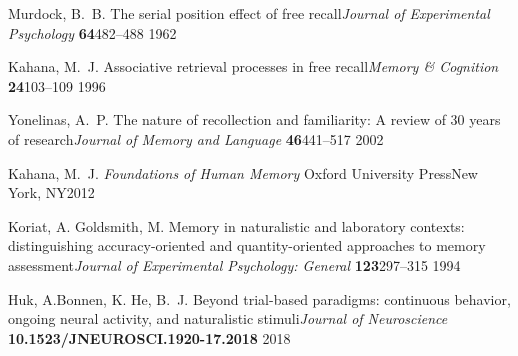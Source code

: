 \documentclass[10pt]{article}
\providecommand{\DIFaddtex}[1]{{\protect\color{blue}\uwave{#1}}} %
\providecommand{\DIFadd}[1]{\texorpdfstring{\DIFaddtex{#1}}{#1}} %
\begin{document}

\begin{thebibliography}{10}
\expandafter\ifx\csname \DIFadd{url}\endcsname\relax
  \def\url#1{\texttt{#1}}\fi
\expandafter\ifx\csname \DIFadd{urlprefix}\endcsname\relax\def\urlprefix{URL }\fi
\providecommand{\bibinfo}[2]{#2}
\providecommand{\eprint}[2][]{\url{#2}}

\bibinfo{author}{Murdock, B.~B.}
\newblock \bibinfo{title}{The serial position effect of free recall}\DIFadd{.
}\newblock \emph{\bibinfo{journal}{Journal of Experimental Psychology}}
  \textbf{\bibinfo{volume}{64}}\DIFadd{, }\bibinfo{pages}{482--488}
  \DIFadd{(}\bibinfo{year}{1962}\DIFadd{).
}

\bibinfo{author}{Kahana, M.~J.}
\newblock \bibinfo{title}{Associative retrieval processes in free recall}\DIFadd{.
}\newblock \emph{\bibinfo{journal}{Memory \& Cognition}}
  \textbf{\bibinfo{volume}{24}}\DIFadd{, }\bibinfo{pages}{103--109}
  \DIFadd{(}\bibinfo{year}{1996}\DIFadd{).
}

\bibinfo{author}{Yonelinas, A.~P.}
\newblock \bibinfo{title}{The nature of recollection and familiarity: A review
  of 30 years of research}\DIFadd{.
}\newblock \emph{\bibinfo{journal}{Journal of Memory and Language}}
  \textbf{\bibinfo{volume}{46}}\DIFadd{, }\bibinfo{pages}{441--517}
  \DIFadd{(}\bibinfo{year}{2002}\DIFadd{).
}

\bibinfo{author}{Kahana, M.~J.}
\newblock \emph{\bibinfo{title}{Foundations of Human Memory}}
  \DIFadd{(}\bibinfo{publisher}{Oxford University Press}\DIFadd{, }\bibinfo{address}{New York,
  NY}\DIFadd{, }\bibinfo{year}{2012}\DIFadd{).
}

\bibinfo{author}{Koriat, A.} \DIFadd{\& }\bibinfo{author}{Goldsmith, M.}
\newblock \bibinfo{title}{Memory in naturalistic and laboratory contexts:
  distinguishing accuracy-oriented and quantity-oriented approaches to memory
  assessment}\DIFadd{.
}\newblock \emph{\bibinfo{journal}{Journal of Experimental Psychology: General}}
  \textbf{\bibinfo{volume}{123}}\DIFadd{, }\bibinfo{pages}{297--315}
  \DIFadd{(}\bibinfo{year}{1994}\DIFadd{).
}

\bibinfo{author}{Huk, A.}\DIFadd{, }\bibinfo{author}{Bonnen, K.} \DIFadd{\& }\bibinfo{author}{He,
  B.~J.}
\newblock \bibinfo{title}{Beyond trial-based paradigms: continuous behavior,
  ongoing neural activity, and naturalistic stimuli}\DIFadd{.
}\newblock \emph{\bibinfo{journal}{Journal of Neuroscience}}
  \textbf{\bibinfo{volume}{10.1523/JNEUROSCI.1920-17.2018}}
  \DIFadd{(}\bibinfo{year}{2018}\DIFadd{).
}


\end{thebibliography}
\end{document}
